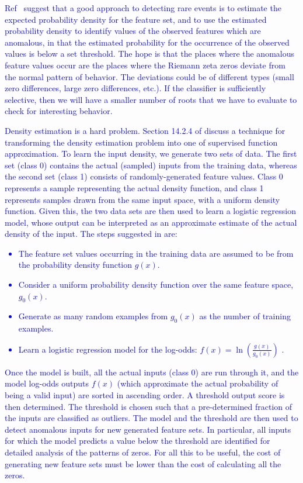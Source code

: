 \documentclass[twoside]{article}
\theoremstyle{definition}
\begin{document}
\textcolor{blue}{ 
Ref~\cite{Friedman(2001)} suggest that  a good approach to detecting rare events is to estimate the expected probability density for the feature set, and to use the estimated probability density to identify values of the observed features which are anomalous, in that the estimated probability for the occurrence of the observed values is below a set threshold. The hope is that the places where the anomalous feature values occur are the places where the Riemann zeta zeros deviate from the normal pattern of behavior. The deviations could be of different types (small zero differences, large zero differences, etc.). If the classifier is sufficiently selective, then we will have a smaller number of roots that we have to evaluate to check for interesting behavior. 
}

\textcolor{blue}{ 
Density estimation is a hard problem. Section 14.2.4 of \cite{Friedman(2001)}  discuss a technique for transforming the density estimation problem into one of supervised function approximation. To learn the input density, we generate two sets of data. The first set (class 0) contains the actual (sampled) inputs from the training data, whereas the second set (class 1) consists of randomly-generated feature values. Class 0 represents a sample representing the actual density function, and class 1 represents samples drawn from the same input space, with a uniform density function. Given this, the two data sets are then used to learn a logistic regression model, whose output can be interpreted as an approximate estimate of the actual density of the input. The steps suggested in \cite{Friedman(2001)} are:
\begin{itemize}
\item The feature set values occurring in the training data are assumed to be from the probability density function $g(x)$.
\item Consider a uniform probability density function over the same feature space, $g_0(x)$.
\item Generate  as many random examples from $g_0(x)$ as the number of training examples.
\item Learn a logistic regression model for the log-odds: $f(x) = \ln(\frac{g(x)}{g_0(x)})$ . 
\end{itemize}
}
          
\textcolor{blue}{ 
Once the model is built, all the actual inputs (class 0) are run through it, and the model log-odds outputs $f(x)$ (which approximate the actual probability of being a valid input) are sorted in ascending order. A threshold output score is then determined. The threshold is chosen such that a pre-determined fraction of the inputs are classified as outliers. The model and the threshold are then used  to detect anomalous inputs for new generated feature sets. In particular, all inputs for which the model predicts a value below the threshold are identified for detailed analysis of the patterns of zeros. For all this to be useful, the cost of generating new feature sets must be lower than the cost of calculating all the zeros.
}
\end{document}
